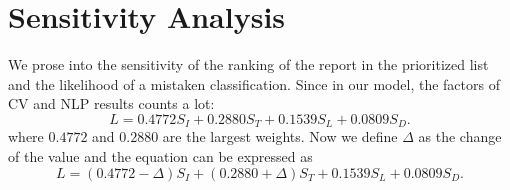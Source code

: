 \documentclass{mcmthesis}
\begin{document}
\section{Sensitivity Analysis}
	We prose into the sensitivity of the ranking of the report in the prioritized list  and the likelihood of a mistaken classification. Since in our model, the factors of CV and NLP results counts a lot:
	\begin{equation*}
		L=0.4772 S_{I}+0.2880 S_{T}+0.1539 S_{L}+0.0809 S_{D}.
	\end{equation*}
	where $0.4772$ and $0.2880$ are the largest weights. Now we define $\Delta$ as the change of the value and the equation can be expressed as
	\begin{equation*}
		L=(0.4772-\Delta) S_{I}+(0.2880+\Delta) S_{T}+0.1539 S_{L}+0.0809 S_{D}.
	\end{equation*}
	
\end{document}

